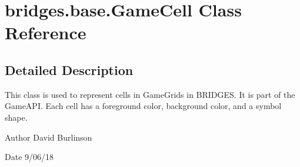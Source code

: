 \hypertarget{classbridges_1_1base_1_1_game_cell}{}\section{bridges.\+base.\+Game\+Cell Class Reference}
\label{classbridges_1_1base_1_1_game_cell}


\subsection{Detailed Description}
This class is used to represent cells in Game\+Grids in B\+R\+I\+D\+G\+ES. It is part of the Game\+A\+PI. Each cell has a foreground color, background color, and a symbol shape. 

\begin{DoxyAuthor}{Author}
David Burlinson 
\end{DoxyAuthor}
\begin{DoxyDate}{Date}
9/06/18 
\end{DoxyDate}
